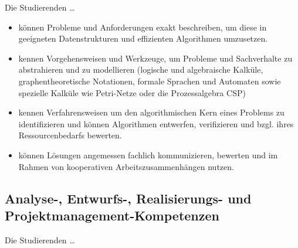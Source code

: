 Die Studierenden \ldots{}

\begin{itemize}
\tightlist
\item
  können Probleme und Anforderungen exakt beschreiben, um diese in
  geeigneten Datenstrukturen und effizienten Algorithmen umzusetzen.
\item
  kennen Vorgehensweisen und Werkzeuge, um Probleme und Sachverhalte zu
  abstrahieren und zu modellieren (logische und algebraische Kalküle,
  graphentheoretische Notationen, formale Sprachen und Automaten sowie
  spezielle Kalküle wie Petri-Netze oder die Prozessalgebra CSP)
\item
  kennen Verfahrensweisen um den algorithmischen Kern eines Problems zu
  identifizieren und können Algorithmen entwerfen, verifizieren und
  bzgl. ihres Ressourcenbedarfs bewerten.
\item
  können Lösungen angemessen fachlich kommunizieren, bewerten und im
  Rahmen von kooperativen Arbeitszusammenhängen nutzen.
\end{itemize}

\subsection{Analyse-, Entwurfs-, Realisierungs- und
Projektmanagement-Kompetenzen\label{/mi-2017/selbstbericht/0200-qualifikationsziele/0000-qualifikationsziele}}\label{analyse--entwurfs--realisierungs--und-projektmanagement-kompetenzenpathlabelmi-2017selbstbericht0200-qualifikationsziele0000-qualifikationsziele}

Die Studierenden \ldots{}

